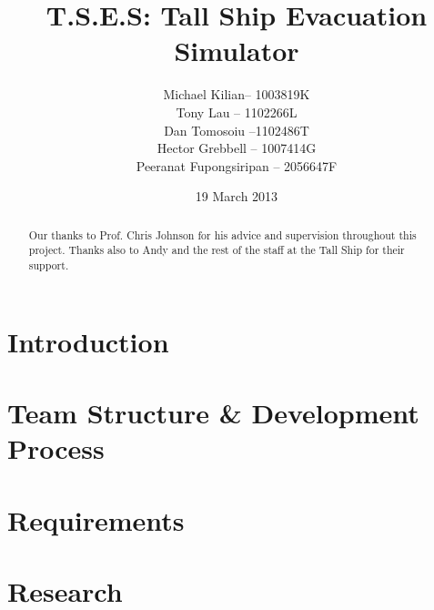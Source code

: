 \documentclass{l3proj}
\begin{document}
\title{T.S.E.S: Tall Ship Evacuation Simulator}
\author{Michael Kilian-- 1003819K \\
        Tony Lau -- 1102266L\\
        Dan Tomosoiu --1102486T \\
        Hector Grebbell -- 1007414G \\
        Peeranat Fupongsiripan -- 2056647F}
\date{19 March 2013}
\maketitle


\begin{abstract}

\end{abstract}

\renewcommand{\abstractname}{Acknowledgements}
\begin{abstract}
Our thanks to Prof. Chris Johnson for his advice and supervision throughout this project. Thanks also to Andy and the rest of the staff at the Tall Ship for their support.
\end{abstract}

\educationalconsent
\tableofcontents
\chapter{Introduction}
\label{introduction}




\chapter{Team Structure \& Development Process}
\label{organisations}




\chapter{Requirements}
\label{requirements}


\chapter{Research}
\label{research}
\end{document}
